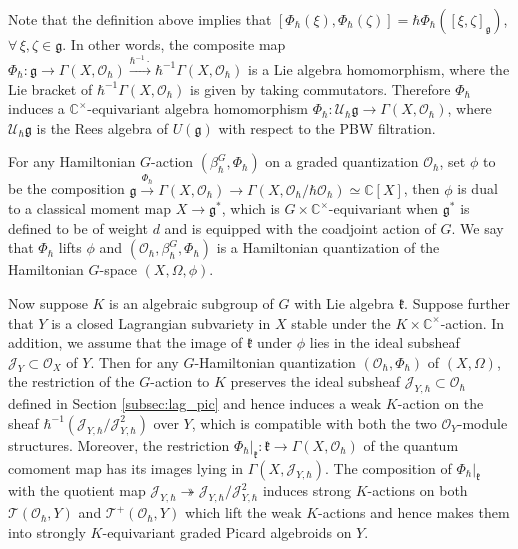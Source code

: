 \documentclass[12pt]{amsart}
\newcommand{\C}{\mathbb{C}}
\newcommand{\U}{\mathcal{U}}
\newcommand{\J}{\mathcal{J}}
\newcommand{\g}{\mathfrak{g}}
\newcommand{\kf}{\mathfrak{k}}
\newcommand{\TT}{\mathscr{T}}
\newcommand{\tatp}{\TT^+(\Q, Y)}
\newcommand{\tat}{\TT(\Q,Y)}
\newcommand{\cm}{\C^\times}
\newcommand{\OO}{\mathcal{O}}
\newcommand{\Q}{\OO_\hbar}
\theoremstyle{definition}
\numberwithin{equation}{section}
\begin{document}
Note that the definition above implies that $ [\Phi_\hbar(\xi), \Phi_\hbar(\zeta)] = \hbar \Phi_\hbar ([\xi, \zeta]_\g)$, $\forall \, \xi, \zeta \in \g$. In other words, the composite map $\Phi_\hbar: \g \to \Gamma(X, \OO_\hbar) \xrightarrow{\hbar^{-1} \cdot} \hbar^{-1} \Gamma(X, \OO_\hbar)$ is a Lie algebra homomorphism, where the Lie bracket of $\hbar^{-1} \Gamma(X, \OO_\hbar)$ is given by taking commutators. Therefore $\Phi_\hbar$ induces a $\cm$-equivariant algebra homomorphism $\Phi_\hbar: \U_\hbar \g \to \Gamma(X, \OO_\hbar)$, where $\U_\hbar \g$ is the Rees algebra of  $U(\g)$
with respect to the PBW filtration.

For any Hamiltonian $G$-action $(\beta_\hbar^G, \Phi_\hbar)$ on a graded quantization $\OO_\hbar$, set $\phi$ to be the composition $\g \xrightarrow{\Phi_\hbar} \Gamma(X, \OO_\hbar) \to \Gamma(X, \OO_\hbar / \hbar \OO_\hbar) \simeq \C[X] $, then $\phi$ is dual to a classical moment map $X \to \g^*$, which is $G \times \cm$-equivariant when $\g^*$ is defined to be of weight $d$ and is equipped with the coadjoint action of $G$. We say that $\Phi_\hbar$ lifts $\phi$ and $(\OO_\hbar, \beta_\hbar^G, \Phi_\hbar)$ is a Hamiltonian quantization of the Hamiltonian $G$-space $(X, \Omega, \phi)$.

Now suppose $K$ is an algebraic subgroup of $G$ with Lie algebra $\kf$. Suppose further that  $Y$ is a closed Lagrangian subvariety in $X$ stable under the $K \times \cm$-action. In addition, we assume that the image of $\mathfrak{k}$ under $\phi$ lies in the ideal subsheaf $\J_Y \subset \OO_X$ of $Y$. Then for any $G$-Hamiltonian quantization $(\OO_\hbar,\Phi_\hbar)$ of $(X, \Omega)$, the restriction of the $G$-action to $K$ preserves the ideal subsheaf $\J_{Y,\hbar} \subset \OO_\hbar$ defined in Section \ref{subsec:lag_pic} and hence induces a weak $K$-action on the sheaf $\hbar^{-1}(\J_{Y,\hbar} / \J_{Y,\hbar}^2)$ over $Y$, which is compatible with both the two $\OO_Y$-module structures. Moreover, the restriction $\Phi_\hbar|_{\kf} : \kf \to \Gamma(X, \OO_\hbar)$ of the quantum comoment map has its images lying in $\Gamma(X, \J_{Y,\hbar})$. The composition of $\Phi_\hbar|_{\kf}$ with the quotient map $\J_{Y,\hbar} \twoheadrightarrow \J_{Y,\hbar} / \J_{Y,\hbar}^2$ induces strong $K$-actions on both $\tat$ and $\tatp$ which lift the weak $K$-actions and hence makes them into strongly $K$-equivariant graded Picard algebroids on $Y$. %
\end{document}
